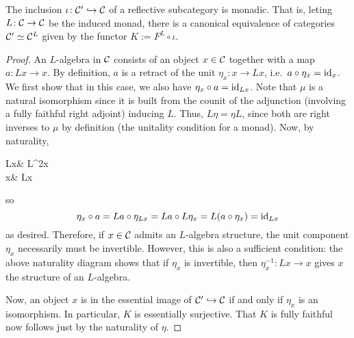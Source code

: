 \begin{proposition}\label{proposition:reflective-subcategories-are-monadic}
	The inclusion \(\iota\!:\mathcal{C}'\hookrightarrow\mathcal{C}\) of a reflective subcategory is monadic. That is, leting \(L\!:\mathcal{C}\to\mathcal{C}\) be the induced monad, there is a canonical equivalence of categories
	\(\mathcal{C}'\simeq\mathcal{C}^L\) given by the functor \(K := F^L\circ\iota\).
\end{proposition}
\begin{proof}
An \(L\)-algebra in \(\mathcal{C}\) consists of an object \(x\in\mathcal{C}\) together with a map \(a\!:Lx\to x\). By definition, \(a\) is a retract of the unit \(\eta_x\!:x\to Lx\), i.e.\
\(a\circ\eta_x = \mathrm{id}_x\). We first show that in this case, we also have \(\eta_x\circ a = \mathrm{id}_{Lx}\). Note that \(\mu\) is a natural isomorphism since it is built from the
counit of the adjunction (involving a fully faithful right adjoint) inducing \(L\). Thus, \(L\eta = \eta L\), since both are right inverses to \(\mu\) by definition (the unitality condition
for a monad). Now, by naturality,
\begin{diagram*}
	Lx\ar[d,"a"']\ar[r,"\eta_{Lx}"] & L^2x\ar[d,"La"] \\
	x\ar[r,"\eta_x"] & Lx
\end{diagram*}
so
\[ \eta_x\circ a = La\circ\eta_{Lx} = La\circ L\eta_x = L(a\circ\eta_x) = \mathrm{id}_{Lx} \]
as desired. Therefore, if \(x\in\mathcal{C}\) admits an \(L\)-algebra structure, the unit component \(\eta_x\) necessarily must be invertible. However,
this is also a sufficient condition: the above naturality diagram shows that if \(\eta_x\) is invertible, then \(\eta_x^{-1}\!:Lx\to x\) gives \(x\) the structure
of an \(L\)-algebra.

Now, an object \(x\) is in the essential image of \(\mathcal{C}'\hookrightarrow\mathcal{C}\) if and only if \(\eta_x\) is an isomorphism. In particular, \(K\) is essentially surjective.
That \(K\) is fully faithful now follows just by the naturality of \(\eta\).
\end{proof}


